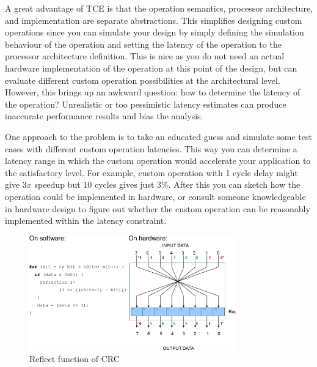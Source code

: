 \documentclass[twoside]{tceusermanual}
\begin{document}

A great advantage of TCE is that the operation semantics, processor
architecture, and implementation are separate abstractions. This
simplifies designing custom operations since you can simulate your
design by simply defining the simulation behaviour of the operation
and setting the latency of the operation to the processor architecture
definition. This is nice as you do not need an actual hardware
implementation of the operation at this point of the design, but can
evaluate different custom operation possibilities at the architectural
level. However, this brings up an awkward question: how to determine
the latency of the operation? Unrealistic or too pessimistic latency
estimates can produce inaccurate performance results and bias the
analysis.

One approach to the problem is to take an educated guess and simulate
some test cases with different custom operation latencies. This way
you can determine a latency range in which the custom operation would
accelerate your application to the satisfactory level. For example,
custom operation with 1 cycle delay might give $3x$ speedup but $10$
cycles gives just 3\%.  After this you can sketch how the operation
could be implemented in hardware, or consult someone knowledgeable in
hardware design to figure out whether the custom operation can be
reasonably implemented within the latency constraint.

\begin{figure}
  \begin{center} \includegraphics[width=0.8\textwidth]{eps/reflect}
  \caption{Reflect function of CRC} 
  \label{fig:reflect} \end{center}
\end{figure}
\end{document}
